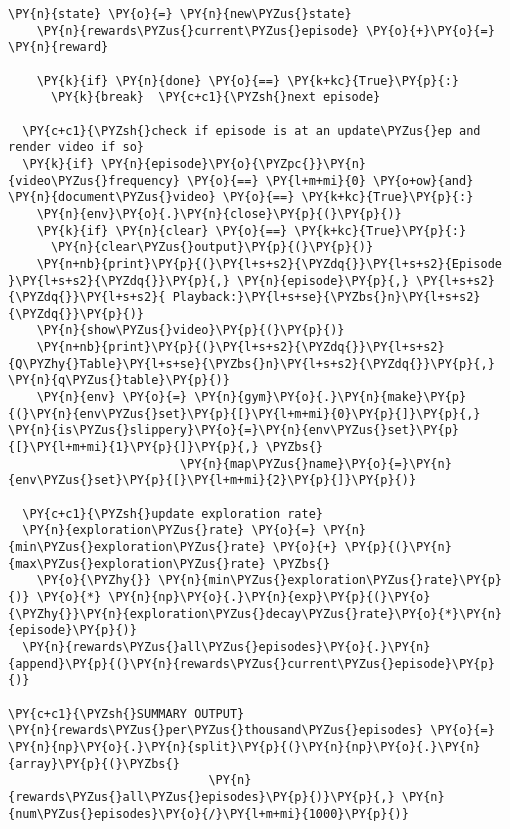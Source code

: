 \begin{tcolorbox}[breakable, size=fbox, boxrule=1pt, pad at break*=1mm,colback=cellbackground, colframe=cellborder]
\begin{Verbatim}[commandchars=\\\{\}]
    \PY{n}{state} \PY{o}{=} \PY{n}{new\PYZus{}state}
    \PY{n}{rewards\PYZus{}current\PYZus{}episode} \PY{o}{+}\PY{o}{=} \PY{n}{reward}

    \PY{k}{if} \PY{n}{done} \PY{o}{==} \PY{k+kc}{True}\PY{p}{:}
      \PY{k}{break}  \PY{c+c1}{\PYZsh{}next episode}

  \PY{c+c1}{\PYZsh{}check if episode is at an update\PYZus{}ep and render video if so}
  \PY{k}{if} \PY{n}{episode}\PY{o}{\PYZpc{}}\PY{n}{video\PYZus{}frequency} \PY{o}{==} \PY{l+m+mi}{0} \PY{o+ow}{and} \PY{n}{document\PYZus{}video} \PY{o}{==} \PY{k+kc}{True}\PY{p}{:}
    \PY{n}{env}\PY{o}{.}\PY{n}{close}\PY{p}{(}\PY{p}{)}
    \PY{k}{if} \PY{n}{clear} \PY{o}{==} \PY{k+kc}{True}\PY{p}{:}
      \PY{n}{clear\PYZus{}output}\PY{p}{(}\PY{p}{)}
    \PY{n+nb}{print}\PY{p}{(}\PY{l+s+s2}{\PYZdq{}}\PY{l+s+s2}{Episode }\PY{l+s+s2}{\PYZdq{}}\PY{p}{,} \PY{n}{episode}\PY{p}{,} \PY{l+s+s2}{\PYZdq{}}\PY{l+s+s2}{ Playback:}\PY{l+s+se}{\PYZbs{}n}\PY{l+s+s2}{\PYZdq{}}\PY{p}{)}
    \PY{n}{show\PYZus{}video}\PY{p}{(}\PY{p}{)}
    \PY{n+nb}{print}\PY{p}{(}\PY{l+s+s2}{\PYZdq{}}\PY{l+s+s2}{Q\PYZhy{}Table}\PY{l+s+se}{\PYZbs{}n}\PY{l+s+s2}{\PYZdq{}}\PY{p}{,} \PY{n}{q\PYZus{}table}\PY{p}{)}
    \PY{n}{env} \PY{o}{=} \PY{n}{gym}\PY{o}{.}\PY{n}{make}\PY{p}{(}\PY{n}{env\PYZus{}set}\PY{p}{[}\PY{l+m+mi}{0}\PY{p}{]}\PY{p}{,} \PY{n}{is\PYZus{}slippery}\PY{o}{=}\PY{n}{env\PYZus{}set}\PY{p}{[}\PY{l+m+mi}{1}\PY{p}{]}\PY{p}{,} \PYZbs{}
                        \PY{n}{map\PYZus{}name}\PY{o}{=}\PY{n}{env\PYZus{}set}\PY{p}{[}\PY{l+m+mi}{2}\PY{p}{]}\PY{p}{)}

  \PY{c+c1}{\PYZsh{}update exploration rate}
  \PY{n}{exploration\PYZus{}rate} \PY{o}{=} \PY{n}{min\PYZus{}exploration\PYZus{}rate} \PY{o}{+} \PY{p}{(}\PY{n}{max\PYZus{}exploration\PYZus{}rate} \PYZbs{}
    \PY{o}{\PYZhy{}} \PY{n}{min\PYZus{}exploration\PYZus{}rate}\PY{p}{)} \PY{o}{*} \PY{n}{np}\PY{o}{.}\PY{n}{exp}\PY{p}{(}\PY{o}{\PYZhy{}}\PY{n}{exploration\PYZus{}decay\PYZus{}rate}\PY{o}{*}\PY{n}{episode}\PY{p}{)}
  \PY{n}{rewards\PYZus{}all\PYZus{}episodes}\PY{o}{.}\PY{n}{append}\PY{p}{(}\PY{n}{rewards\PYZus{}current\PYZus{}episode}\PY{p}{)}

\PY{c+c1}{\PYZsh{}SUMMARY OUTPUT}
\PY{n}{rewards\PYZus{}per\PYZus{}thousand\PYZus{}episodes} \PY{o}{=} \PY{n}{np}\PY{o}{.}\PY{n}{split}\PY{p}{(}\PY{n}{np}\PY{o}{.}\PY{n}{array}\PY{p}{(}\PYZbs{}
                            \PY{n}{rewards\PYZus{}all\PYZus{}episodes}\PY{p}{)}\PY{p}{,} \PY{n}{num\PYZus{}episodes}\PY{o}{/}\PY{l+m+mi}{1000}\PY{p}{)}


\end{Verbatim}
\end{tcolorbox}
